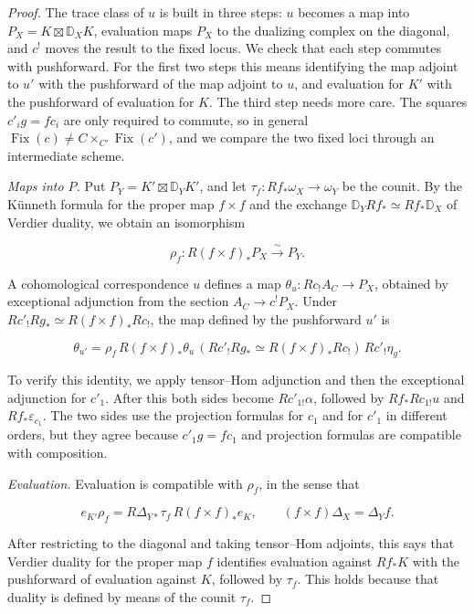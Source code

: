 \documentclass[11pt]{article}
\providecommand{\Fix}{}\renewcommand{\Fix}{\operatorname{Fix}}
\begin{document}
\begin{proof}[{Proof}]\label{bp207}%
The trace class of \(u\) is built in three steps: \(u\) becomes a map into \(P_X=K\boxtimes\mathbb D_XK\), evaluation maps \(P_X\) to the dualizing complex on the diagonal, and \(c^!\) moves the result to the fixed locus. We check that each step commutes with pushforward. For the first two steps this means identifying the map adjoint to \(u'\) with the pushforward of the map adjoint to \(u\), and evaluation for \(K'\) with the pushforward of evaluation for \(K\). The third step needs more care. The squares \(c'_ig=fc_i\) are only required to commute, so in general \(\Fix(c)\ne C\times_{C'}\Fix(c')\), and we compare the two fixed loci through an intermediate scheme.

\emph{Maps into \(P\).} Put \(P_Y=K'\boxtimes \mathbb D_YK'\), and let \(\tau_f:Rf_*\omega_X\to\omega_Y\) be the counit. By the Künneth formula for the proper map \(f\times f\) and the exchange \(\mathbb D_YRf_*\simeq Rf_*\mathbb D_X\) of Verdier duality, we obtain an isomorphism

\[
\rho_f:R(f\times f)_*P_X\xrightarrow{\sim}P_Y.
\]

A cohomological correspondence \(u\) defines a map \(\theta_u:Rc_!A_C\to P_X\), obtained by exceptional adjunction from the section \(A_C\to c^!P_X\). Under \(Rc'_!Rg_*\simeq R(f\times f)_*Rc_!\), the map defined by the pushforward \(u'\) is

\[
\theta_{u'}=
\rho_f\,R(f\times f)_*\theta_u\,
(Rc'_!Rg_*\simeq R(f\times f)_*Rc_!)\,Rc'_!\eta_g.
\]

To verify this identity, we apply tensor–Hom adjunction and then the exceptional adjunction for \(c'_1\). After this both sides become \(Rc'_{1!}\alpha\), followed by \(Rf_*Rc_{1!}u\) and \(Rf_*\varepsilon_{c_1}\). The two sides use the projection formulas for \(c_1\) and for \(c'_1\) in different orders, but they agree because \(c'_1g=fc_1\) and projection formulas are compatible with composition.

\emph{Evaluation.} Evaluation is compatible with \(\rho_f\), in the sense that

\[
e_{K'}\rho_f=
R\Delta_{Y*}\tau_f\,R(f\times f)_*e_K,
\qquad (f\times f)\Delta_X=\Delta_Yf.
\]

After restricting to the diagonal and taking tensor–Hom adjoints, this says that Verdier duality for the proper map \(f\) identifies evaluation against \(Rf_*K\) with the pushforward of evaluation against \(K\), followed by \(\tau_f\). This holds because that duality is defined by means of the counit \(\tau_f\).


\end{proof}
\end{document}
